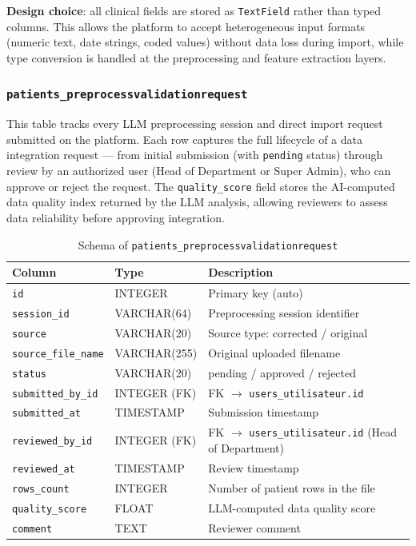\documentclass[12pt,a4paper,twoside]{report}
\begin{document}
\noindent\textbf{Design choice}: all clinical fields are stored as \texttt{TextField} rather than typed columns. This allows the platform to accept heterogeneous input formats (numeric text, date strings, coded values) without data loss during import, while type conversion is handled at the preprocessing and feature extraction layers.

\subsubsection{\texttt{patients\_preprocessvalidationrequest}}

This table tracks every LLM preprocessing session and direct import request submitted on the platform. Each row captures the full lifecycle of a data integration request — from initial submission (with \texttt{pending} status) through review by an authorized user (Head of Department or Super Admin), who can approve or reject the request. The \texttt{quality\_score} field stores the AI-computed data quality index returned by the LLM analysis, allowing reviewers to assess data reliability before approving integration.

\begin{table}[htbp]
\centering
\caption{Schema of \texttt{patients\_preprocessvalidationrequest}}
\label{tab:schema_preprocess}
\small\begin{tabularx}{\textwidth}{p{3.8cm}p{3cm}X}
\toprule
\textbf{Column} & \textbf{Type} & \textbf{Description} \\
\midrule
\texttt{id} & INTEGER & Primary key (auto) \\
\texttt{session\_id} & VARCHAR(64) & Preprocessing session identifier \\
\texttt{source} & VARCHAR(20) & Source type: corrected / original \\
\texttt{source\_file\_name} & VARCHAR(255) & Original uploaded filename \\
\texttt{status} & VARCHAR(20) & pending / approved / rejected \\
\texttt{submitted\_by\_id} & INTEGER (FK) & FK $\to$ \texttt{users\_utilisateur.id} \\
\texttt{submitted\_at} & TIMESTAMP & Submission timestamp \\
\texttt{reviewed\_by\_id} & INTEGER (FK) & FK $\to$ \texttt{users\_utilisateur.id} (Head of Department) \\
\texttt{reviewed\_at} & TIMESTAMP & Review timestamp \\
\texttt{rows\_count} & INTEGER & Number of patient rows in the file \\
\texttt{quality\_score} & FLOAT & LLM-computed data quality score \\
\texttt{comment} & TEXT & Reviewer comment \\
\bottomrule
\end{tabularx}
\end{table}
\end{document}
